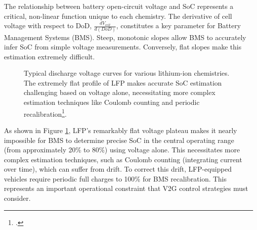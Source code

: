 The relationship between battery open-circuit voltage and SoC represents a critical, non-linear function unique to each chemistry. The derivative of cell voltage with respect to DoD, $\frac{dV_{cell}}{d(DoD)}$, constitutes a key parameter for Battery Management Systems (BMS). Steep, monotonic slopes allow BMS to accurately infer SoC from simple voltage measurements. Conversely, flat slopes make this estimation extremely difficult.

\begin{figure}[H]
    \centering
    \caption{Typical discharge voltage curves for various lithium-ion chemistries. The extremely flat profile of LFP makes accurate SoC estimation challenging based on voltage alone, necessitating more complex estimation techniques like Coulomb counting and periodic recalibration\footcite{plett2015battery}.}
    \label{fig:voltage_curves_detailed}
\end{figure}
\noindent
As shown in Figure \ref{fig:voltage_curves_detailed}, LFP's remarkably flat voltage plateau makes it nearly impossible for BMS to determine precise SoC in the central operating range (from approximately 20\% to 80\%) using voltage alone. This necessitates more complex estimation techniques, such as Coulomb counting (integrating current over time), which can suffer from drift. To correct this drift, LFP-equipped vehicles require periodic full charges to 100\% for BMS recalibration. This represents an important operational constraint that V2G control strategies must consider.

